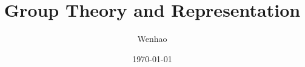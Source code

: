 \documentclass{article}
\theoremstyle{remark}
\theoremstyle{remark}
\theoremstyle{definition}
\begin{document}
\title{Group Theory and Representation}
\author{Wenhao}
\date{\today}
\maketitle

\tableofcontents





\newpage
\appendix


\end{document}
